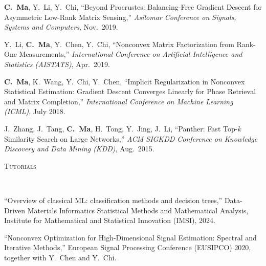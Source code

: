 \documentclass[a4paper, 10pt]{article}
\newenvironment{changemargin}[2]{%
  \begin{list}{}{%
    \setlength{\topsep}{0pt}%
    \setlength{\leftmargin}{#1}%
    \setlength{\rightmargin}{#2}%
    \setlength{\listparindent}{\parindent}%
    \setlength{\itemindent}{\parindent}%
    \setlength{\parsep}{\parskip}%
  }%
  \item[]}{\end{list}
}
\newcommand{\lineover}{
	\begin{changemargin}{-0.05in}{-0.05in}
		\vspace*{-8pt}
		\hrulefill \\
		\vspace*{-2pt}
	\end{changemargin}
}
\newcommand{\header}[1]{
	\begin{changemargin}{-0.5in}{-0.5in}
		\scshape{#1}\\
  	\lineover
	\end{changemargin}
}
\newenvironment{body} {
	\vspace*{-16pt}
	\begin{changemargin}{-0.3in}{-0.5in}
  }	
	{\end{changemargin}
}
\begin{document}
\begin{body}
\begin{enumerate}[label={[{C}{{\arabic*}}]}]
	\item \textbf{C.~Ma}, Y.~Li, Y.~Chi, {``Beyond Procrustes: Balancing-Free Gradient Descent for Asymmetric Low-Rank Matrix Sensing,''} \emph{Asilomar Conference on Signals, Systems and Computers}, Nov.~2019. \\
	\item 
	Y.~Li, \textbf{C.~Ma}, Y.~Chen, Y.~Chi, {{``Nonconvex Matrix Factorization from Rank-One Measurements,''}} \emph{International Conference on Artificial Intelligence and Statistics (AISTATS)}, Apr.~2019. \\
	
	\item 
	\textbf{C.~Ma}, K.~Wang, Y.~Chi, Y.~Chen, {{``Implicit Regularization in Nonconvex Statistical Estimation: Gradient Descent Converges Linearly for Phase Retrieval and Matrix Completion,''}} \emph{International Conference on Machine Learning (ICML)}, July 2018. \\
	
	\item J.~Zhang, J.~Tang, \textbf{C.~Ma}, H.~Tong, Y.~Jing, J.~Li, {{``Panther: Fast Top-$k$ Similarity Search on Large Networks,''}} \emph{ACM SIGKDD Conference on Knowledge Discovery and Data Mining (KDD)}, Aug.~2015.\\
	
	
	\end{enumerate}
\end{body}


\bigskip
\header{\LARGE{Tutorials}}
\begin{body}

\vspace{18pt}
\begin{enumerate}[label={[{Tut}{{\arabic*}}]}]
\item ``Overview of classical ML: classification methods and decision trees,'' Data-Driven Materials Informatics
Statistical Methods and Mathematical Analysis, Institute for Mathematical and Statistical Innovation (IMSI), 2024.  
\item  {``Nonconvex Optimization for High-Dimensional Signal Estimation: Spectral and Iterative Methods,''} European Signal Processing Conference (EUSIPCO) 2020, together with Y.~Chen and Y.~Chi.
\end{enumerate}

\end{body}
\end{document}
